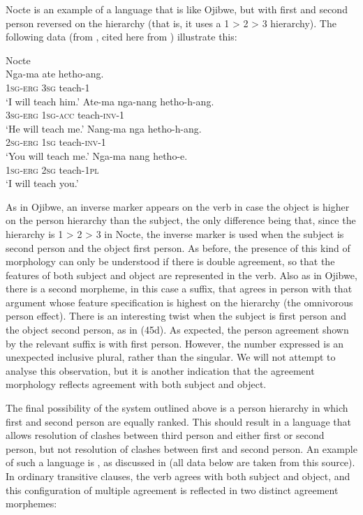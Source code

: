 \documentclass[output=paper]{langsci/langscibook}
\begin{document}
Nocte is an example of a language that is like Ojibwe, but with first and second person reversed on the hierarchy (that is, it uses a 1 > 2 > 3 hierarchy). The following data (from \citealt[641]{DeLancey1981}, cited here from \citealt[172]{Croft2003}) illustrate this:

\ea \label{bkm:Ref328735211}  Nocte\\
\ea\gll  Nga-ma  ate  hetho-ang.  \\
    \textsc{1sg-erg} \textsc{3sg} teach-\textsc{1}\\
\glt    ‘I will teach him.’
\ex \gll  Ate-ma   nga-nang hetho-h-ang.\\
      \textsc{3sg-erg} \textsc{1sg-acc} teach-\textsc{inv-1}\\
\glt     ‘He will teach me.’
\ex \gll Nang-ma nga hetho-h-ang.\\
      \textsc{2sg-erg}  \textsc{1sg} teach-\textsc{inv-1}\\
\glt     ‘You will teach me.’
\ex \gll Nga-ma  nang hetho-e.\\
     \textsc{1sg}-\textsc{erg} \textsc{2sg} teach-\textsc{1pl}\\
\glt    ‘I will teach you.’
\z \z

As in Ojibwe, an inverse marker appears on the verb in case the object is higher on the person hierarchy than the subject, the only difference being that, since the hierarchy is 1 > 2 > 3 in Nocte, the inverse marker is used when the subject is second person and the object first person.  As before, the presence of this kind of morphology can only be understood if there is double agreement, so that the features of both subject and object are represented in the verb. Also as in Ojibwe, there is a second morpheme, in this case a suffix, that agrees in person with that argument whose feature specification is highest on the hierarchy (the omnivorous person effect). There is an interesting twist when the subject is first person and the object second person, as in (45d). As expected, the person agreement shown by the relevant suffix is with first person. However, the number expressed is an unexpected inclusive plural, rather than the singular. We will not attempt to analyse this observation, but it is another indication that the agreement morphology reflects agreement with both subject and object.

The final possibility of the system outlined above is a person hierarchy in which first and second person are equally ranked. This should result in a language that allows resolution of clashes between third person and either first or second person, but not resolution of clashes between first and second person. An example of such a language is , as discussed in \citet{Preminger2014} (all  data below are taken from this source). In ordinary transitive clauses, the verb agrees with both subject and object, and this configuration of multiple agreement is reflected in two distinct agreement morphemes:
\end{document}
